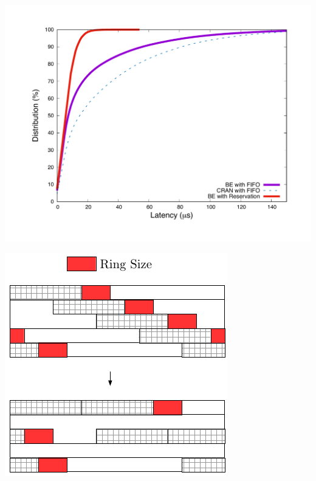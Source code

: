 \documentclass[]{algotel}
\begin{document}
  \begin{minipage}[b]{0.4\linewidth}
\centering
      \includegraphics[scale=0.25]{optim.pdf}
        \label{fig:optimres}
  \end{minipage} 
     \begin{minipage}[b]{0.3\linewidth}
        \begin{center}
      \includegraphics[scale=0.55]{repart2}
            \vspace{0.5cm}
          \label{fig:repart1}
      \end{center} 
  \end{minipage}
\end{document}
